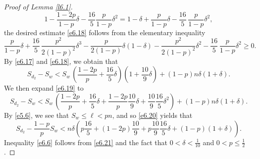 \documentclass[10pt,a4paper]{amsart}
\newcommand{\meg}{\geqslant}
\newcommand{\mik}{\leqslant}
\begin{document}
\begin{proof}[Proof of Lemma \emph{\ref{l6.1}}]
\begin{equation}
1-\frac{1-2p}{1-p}\delta-\frac{16}{5}\frac{p}{1-p}\delta^2 =
1-\delta+ \frac{p}{1-p}\delta -\frac{16}{5}\, \frac{p}{1-p}\delta^2,
\end{equation}
the desired estimate \eqref{e6.18} follows from the elementary inequality
\begin{equation} \label{en.6.3}
\frac{p}{1-p}\delta + \frac{16}{5}\, \frac{p^2}{2(1-p)^2}\delta^3
- \frac{p}{2(1-p)}\delta(1-\delta) - \frac{p^2}{2(1-p)^2}\delta^2
- \frac{16}{5}\, \frac{p}{1-p}\delta^2 \meg 0.
\end{equation}
By \eqref{e6.17} and \eqref{e6.18}, we obtain that
\begin{equation} \label{e6.19}
S_{d_2}-S_w < S_w\, \left(\frac{1-2p}{p}+\frac{16}{5}\delta\right)
\left(1+\frac{10}{9}\delta\right)+(1-p)n\delta\left(1+\delta\right).
\end{equation}
We then expand \eqref{e6.19} to
\begin{equation} \label{e6.20}
S_{d_2}-S_w < S_w\, \left(\frac{1-2p}{p}+ \frac{16}{5}\delta+ \frac{1-2p}{p}\frac{10}{9}\delta +\frac{10}{9}\frac{16}{5}\delta^2\right)+(1-p)n\delta\left(1+\delta\right).
\end{equation}
By \eqref{e5.6}, we see that $S_w\mik \ell< pn$, and so \eqref{e6.20} yields that
\begin{equation} \label{e6.21}
S_{d_2}-\frac{1-p}{p}S_w < n\delta \left(p\frac{16}{5}+(1-2p)\frac{10}{9}+p\frac{10}{9}\frac{16}{5}\delta+(1-p)\left(1+\delta\right)\right).
\end{equation}
Inequality \eqref{e6.6} follows from \eqref{e6.21} and the fact that
$0<\delta<\frac{1}{10}$ and $0<p\mik\frac{1}{2}$.
\end{proof}
\end{document}
